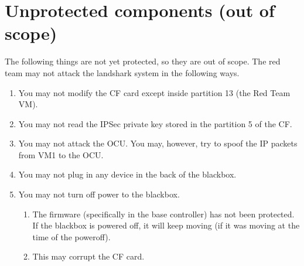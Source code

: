 \section{Unprotected components (out of scope)}
\label{sec:attack-out-of-scope}
The following things are not yet protected, so they are out of scope.
The red team may not attack the landshark system in the following ways.
\begin{enumerate}

  \item You may not modify the CF card except inside partition 13 (the Red Team VM).
  \item You may not read the IPSec private key stored in the partition 5 of the CF.
  \item	You may not attack the OCU. You may, however, try to spoof the IP packets from VM1 to the OCU.
  \item	You may not plug in any device in the back of the blackbox. 
  \item	You may not turn off power to the blackbox.
  \begin{enumerate}
    \item The firmware (specifically in the base controller) has not been protected. If the
      blackbox is powered off, it will keep moving (if it was moving at the time of the
      poweroff).
    \item This may corrupt the CF card.
  \end{enumerate}
\end{enumerate}

